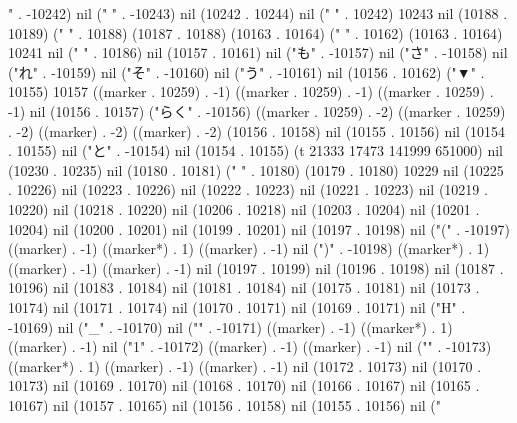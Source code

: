" . -10242) nil (" " . -10243) nil (10242 . 10244) nil (" " . 10242) 10243 nil (10188 . 10189) (" " . 10188) (10187 . 10188) (10163 . 10164) (" " . 10162) (10163 . 10164) 10241 nil ("
" . 10186) nil (10157 . 10161) nil ("も" . -10157) nil ("さ" . -10158) nil ("れ" . -10159) nil ("そ" . -10160) nil ("う" . -10161) nil (10156 . 10162) ("▼" . 10155) 10157 ((marker . 10259) . -1) ((marker . 10259) . -1) ((marker . 10259) . -1) nil (10156 . 10157) ("らく" . -10156) ((marker . 10259) . -2) ((marker . 10259) . -2) ((marker) . -2) ((marker) . -2) (10156 . 10158) nil (10155 . 10156) nil (10154 . 10155) nil ("と" . -10154) nil (10154 . 10155) (t 21333 17473 141999 651000) nil (10230 . 10235) nil (10180 . 10181) (" " . 10180) (10179 . 10180) 10229 nil (10225 . 10226) nil (10223 . 10226) nil (10222 . 10223) nil (10221 . 10223) nil (10219 . 10220) nil (10218 . 10220) nil (10206 . 10218) nil (10203 . 10204) nil (10201 . 10204) nil (10200 . 10201) nil (10199 . 10201) nil (10197 . 10198) nil ("(" . -10197) ((marker) . -1) ((marker*) . 1) ((marker) . -1) nil (")" . -10198) ((marker*) . 1) ((marker) . -1) ((marker) . -1) nil (10197 . 10199) nil (10196 . 10198) nil (10187 . 10196) nil (10183 . 10184) nil (10181 . 10184) nil (10175 . 10181) nil (10173 . 10174) nil (10171 . 10174) nil (10170 . 10171) nil (10169 . 10171) nil ("H" . -10169) nil ("_" . -10170) nil ("{" . -10171) ((marker) . -1) ((marker*) . 1) ((marker) . -1) nil ("1" . -10172) ((marker) . -1) ((marker) . -1) nil ("}" . -10173) ((marker*) . 1) ((marker) . -1) ((marker) . -1) nil (10172 . 10173) nil (10170 . 10173) nil (10169 . 10170) nil (10168 . 10170) nil (10166 . 10167) nil (10165 . 10167) nil (10157 . 10165) nil (10156 . 10158) nil (10155 . 10156) nil ("
